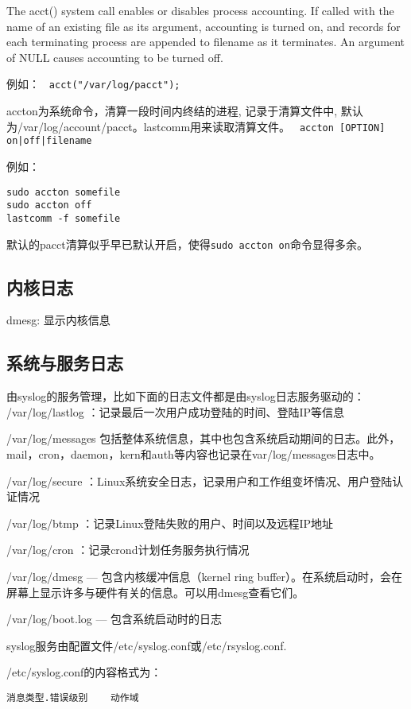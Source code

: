 The  acct()  system  call  enables  or  disables process accounting.  If called with the name of an existing file as its argument,
accounting is turned on, and records for each terminating process are appended to filename as it terminates.  An argument of  NULL
causes accounting to be turned off.

例如：
\verb+ acct("/var/log/pacct");+

accton为系统命令，清算一段时间内终结的进程, 记录于清算文件中, 默认为/var/log/account/pacct。lastcomm用来读取清算文件。
\verb+ accton [OPTION] on|off|filename+

例如：
\begin{verbatim}
sudo accton somefile
sudo accton off
lastcomm -f somefile
\end{verbatim}

默认的pacct清算似乎早已默认开启，使得\verb+sudo accton on+命令显得多余。


\subsection{内核日志}
dmesg: 显示内核信息

\subsection{系统与服务日志}
由syslog的服务管理，比如下面的日志文件都是由syslog日志服务驱动的：      
/var/log/lastlog ：记录最后一次用户成功登陆的时间、登陆IP等信息 

/var/log/messages 包括整体系统信息，其中也包含系统启动期间的日志。此外，mail，cron，daemon，kern和auth等内容也记录在var/log/messages日志中。

/var/log/secure ：Linux系统安全日志，记录用户和工作组变坏情况、用户登陆认证情况 

/var/log/btmp ：记录Linux登陆失败的用户、时间以及远程IP地址 

/var/log/cron ：记录crond计划任务服务执行情况

/var/log/dmesg — 包含内核缓冲信息（kernel ring buffer）。在系统启动时，会在屏幕上显示许多与硬件有关的信息。可以用dmesg查看它们。

/var/log/boot.log — 包含系统启动时的日志

syslog服务由配置文件/etc/syslog.conf或/etc/rsyslog.conf.

/etc/syslog.conf的内容格式为：
\begin{verbatim}
消息类型.错误级别    动作域
\end{verbatim}

